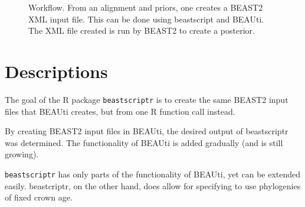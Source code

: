 \documentclass{article}
\begin{document}
\begin{figure}

  \caption{
    Workflow. From an alignment and priors, one creates a BEAST2 XML input file. This
    can be done using beastscript and BEAUti. The XML file created is run by BEAST2
    to create a posterior.
  }
  \label{fig:workflow}
\end{figure}

\section{Descriptions}

The goal of the R package \verb;beastscriptr; is to create the 
same BEAST2 input files that BEAUti creates, but from one R function call 
instead.

By creating BEAST2 input files in BEAUti, 
the desired output of beastscriptr was determined. 
The functionality of BEAUti is added gradually (and is still growing).

\verb;beastscriptr; has only parts of the functionality of BEAUti, yet
can be extended easily. beastcriptr, on the other hand, does allow for specifying
to use phylogenies of fixed crown age.
\end{document}
